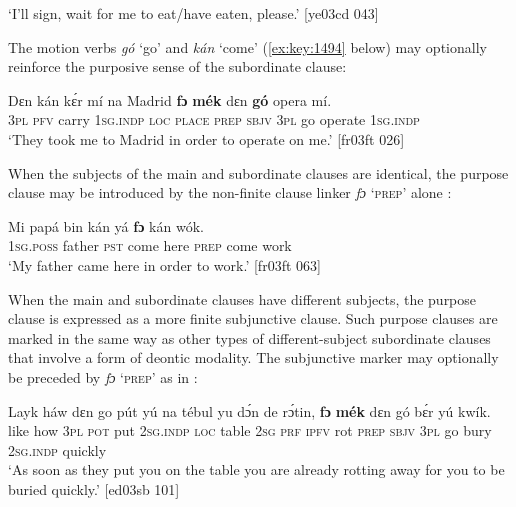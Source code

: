 \glt ‘I’ll sign, wait for me to eat/have eaten, please.’ [ye03cd 043]
\z

The motion verbs \textit{gó} ‘go’  and \textit{kán} ‘come’ (\ref{ex:key:1494} below) may optionally reinforce the purposive sense of the subordinate clause: 


\ea%
    \label{ex:key:1493}
    \gll Dɛn  kán  kɛ́r    mí    na  Madrid  \textbf{fɔ}  \textbf{mék}    dɛn  \textbf{gó}  opera  mí.\\
\textsc{3pl}  \textsc{pfv}  carry  \textsc{1sg.indp}  \textsc{loc}  \textsc{place}  \textsc{prep}  \textsc{sbjv}    \textsc{3pl}  go  operate  \textsc{1sg.indp}\\

\glt ‘They took me to Madrid in order to operate on me.’ [fr03ft 026]
\z

When the subjects of the main and subordinate clauses are identical, the purpose clause may be introduced by the non-finite clause linker \textit{fɔ} ‘\textsc{prep}’ alone :


\ea%
    \label{ex:key:1494}
    \gll Mi    papá  bin  {kán}    yá    \textbf{fɔ}  {kán}    wók.\\
\textsc{1sg.poss}  father  \textsc{pst}  come  here    \textsc{prep}  come  work\\

\glt ‘My father came here in order to work.’ [fr03ft 063]
\z

When the main and subordinate clauses have different subjects, the purpose clause is expressed as a more finite subjunctive clause. Such purpose clauses are marked in the same way as other types of different-subject subordinate clauses that involve a form of deontic modality. The subjunctive marker may optionally be preceded by \textit{fɔ} ‘\textsc{prep}’ as in :


\ea%
    \label{ex:key:1495}
    \gll Layk  háw    dɛn    go  pút  yú    na  tébul  {yu}  dɔ́n  de  rɔ́tin,
\textbf{fɔ}  \textbf{mék}    dɛn  gó  bɛ́r    yú    kwík.\\
like    how    \textsc{3pl}    \textsc{pot}  put  \textsc{2sg.indp}  \textsc{loc}  table  \textsc{2sg}  \textsc{prf}  \textsc{ipfv}  rot
\textsc{prep}  \textsc{sbjv}    \textsc{3pl}  go  bury  \textsc{2sg.indp}  quickly\\

\glt ‘As soon as they put you on the table you are already rotting away 
for you to be buried quickly.’ [ed03sb 101]
\z

